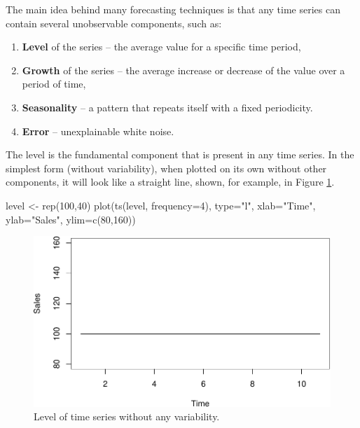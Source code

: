 \documentclass[
]{book}
\newenvironment{Shaded}{\begin{snugshade}}{\end{snugshade}}
\newcommand{\AttributeTok}[1]{\textcolor[rgb]{0.77,0.63,0.00}{#1}}
\newcommand{\DecValTok}[1]{\textcolor[rgb]{0.00,0.00,0.81}{#1}}
\newcommand{\FunctionTok}[1]{\textcolor[rgb]{0.00,0.00,0.00}{#1}}
\newcommand{\NormalTok}[1]{#1}
\newcommand{\OtherTok}[1]{\textcolor[rgb]{0.56,0.35,0.01}{#1}}
\newcommand{\StringTok}[1]{\textcolor[rgb]{0.31,0.60,0.02}{#1}}
\providecommand{\tightlist}{%
  \setlength{\itemsep}{0pt}\setlength{\parskip}{0pt}}
\theoremstyle{definition}
\theoremstyle{definition}
\theoremstyle{definition}
\theoremstyle{definition}
\theoremstyle{remark}
\begin{document}
The main idea behind many forecasting techniques is that any time series can contain several unobservable components, such as:

\begin{enumerate}
\def\labelenumi{\arabic{enumi}.}
\tightlist
\item
  \textbf{Level} of the series -- the average value for a specific time period,
\item
  \textbf{Growth} of the series -- the average increase or decrease of the value over a period of time,
\item
  \textbf{Seasonality} -- a pattern that repeats itself with a fixed periodicity.
\item
  \textbf{Error} -- unexplainable white noise.
\end{enumerate}

The level is the fundamental component that is present in any time series. In the simplest form (without variability), when plotted on its own without other components, it will look like a straight line, shown, for example, in Figure \ref{fig:levelExample}.

\begin{Shaded}
\begin{Highlighting}[]
\NormalTok{level }\OtherTok{\textless{}{-}} \FunctionTok{rep}\NormalTok{(}\DecValTok{100}\NormalTok{,}\DecValTok{40}\NormalTok{)}
\FunctionTok{plot}\NormalTok{(}\FunctionTok{ts}\NormalTok{(level, }\AttributeTok{frequency=}\DecValTok{4}\NormalTok{),}
     \AttributeTok{type=}\StringTok{"l"}\NormalTok{, }\AttributeTok{xlab=}\StringTok{"Time"}\NormalTok{, }\AttributeTok{ylab=}\StringTok{"Sales"}\NormalTok{, }\AttributeTok{ylim=}\FunctionTok{c}\NormalTok{(}\DecValTok{80}\NormalTok{,}\DecValTok{160}\NormalTok{))}
\end{Highlighting}
\end{Shaded}

\begin{figure}
\centering
\includegraphics{Svetunkov--2022----ADAM_files/figure-latex/levelExample-1.pdf}
\caption{\label{fig:levelExample}Level of time series without any variability.}
\end{figure}
\end{document}
